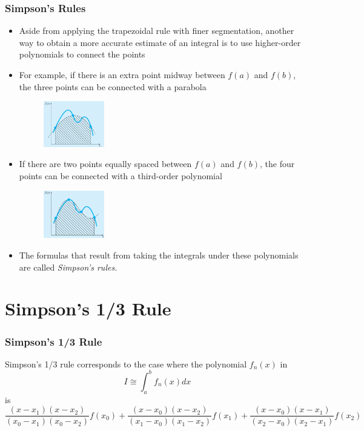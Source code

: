 \documentclass{if-beamer}
\begin{document}
\begin{frame}[t]
	\frametitle{Simpson's Rules}
	\begin{itemize}
		\item Aside from applying the trapezoidal rule with finer segmentation, another way to obtain a more accurate estimate of an integral is to use higher-order polynomials to connect the
		points
		\item For example, if there is an extra point midway between $f(a)$ and $f(b)$, the three
		points can be connected with a parabola
		\begin{figure}
			\centering
			\includegraphics[width=0.25\textwidth]{figures/parab}
		\end{figure}
		\item  If there are two points equally spaced between $f(a)$ and $f(b)$, the four points can be connected with a third-order polynomial
		\begin{figure}
			\centering
			\includegraphics[width = 0.25\textwidth]{figures/other}
		\end{figure}
		\item  The formulas that result from taking the integrals under these
		polynomials are called \textit{Simpson’s rules.}
	\end{itemize}
\end{frame}	

\section{Simpson's 1/3 Rule}
\begin{frame}[t]
	\frametitle{Simpson's 1/3 Rule}
	Simpson's 1/3 rule corresponds to the case where the polynomial $f_n(x)$ in
	$$I \cong \int_{a}^{b}f_n(x)dx $$
	is 
	$$\frac{(x-x_1)(x-x_2)}{(x_0-x_1)(x_0-x_2)}f(x_0) + \frac{(x-x_0)(x-x_2)}{(x_1-x_0)(x_1-x_2)}f(x_1) + \frac{(x-x_0)(x-x_1)}{(x_2-x_0)(x_2-x_1)}f(x_2)$$

\end{frame}
\end{document}
